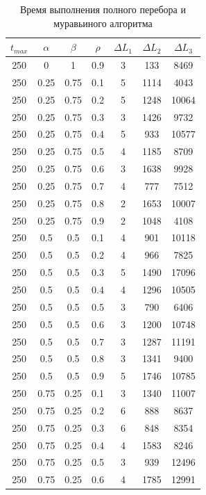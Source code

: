 \documentclass[12pt]{report}
\begin{document}
	\begin{table}[H]
		\begin{center}
			\caption[]{\label{tbl:only7} Время выполнения полного перебора и муравьиного алгоритма}
			\begin{tabular}{|c|c|c|c|c|c|c|}
				\hline
				$t_{max}$ & $\alpha$ & $\beta$ &$\rho$ & $\Delta L_{1}$ & $\Delta L_{2}$ & $\Delta L_{3}$\\
				\hline
				250 & 0 & 1 & 0.9 & 3 & 133 & 8469 \\
				250 & 0.25 & 0.75 & 0.1 & 5 & 1114 & 4043 \\
				250 & 0.25 & 0.75 & 0.2 & 5 & 1248 & 10064 \\
				250 & 0.25 & 0.75 & 0.3 & 3 & 1426 & 9732 \\
				250 & 0.25 & 0.75 & 0.4 & 5 & 933 & 10577 \\
				250 & 0.25 & 0.75 & 0.5 & 4 & 1185 & 8709 \\
				250 & 0.25 & 0.75 & 0.6 & 3 & 1638 & 9928 \\
				250 & 0.25 & 0.75 & 0.7 & 4 & 777 & 7512 \\
				250 & 0.25 & 0.75 & 0.8 & 2 & 1653 & 10007 \\
				250 & 0.25 & 0.75 & 0.9 & 2 & 1048 & 4108 \\
				250 & 0.5 & 0.5 & 0.1 & 4 & 901 & 10118 \\
				250 & 0.5 & 0.5 & 0.2 & 4 & 966 & 7825 \\
				250 & 0.5 & 0.5 & 0.3 & 5 & 1490 & 17096 \\
				250 & 0.5 & 0.5 & 0.4 & 4 & 1296 & 10505 \\
				250 & 0.5 & 0.5 & 0.5 & 3 & 790 & 6406 \\
				250 & 0.5 & 0.5 & 0.6 & 3 & 1200 & 10748 \\
				250 & 0.5 & 0.5 & 0.7 & 3 & 1287 & 11191 \\
				250 & 0.5 & 0.5 & 0.8 & 3 & 1341 & 9400 \\
				250 & 0.5 & 0.5 & 0.9 & 5 & 1746 & 10785 \\
				250 & 0.75 & 0.25 & 0.1 & 3 & 1340 & 11007 \\
				250 & 0.75 & 0.25 & 0.2 & 6 & 888 & 8637 \\
				250 & 0.75 & 0.25 & 0.3 & 6 & 848 & 8354 \\
				250 & 0.75 & 0.25 & 0.4 & 4 & 1583 & 8246 \\
				250 & 0.75 & 0.25 & 0.5 & 3 & 939 & 12496 \\
				250 & 0.75 & 0.25 & 0.6 & 4 & 1785 & 12991 \\

\end{tabular}
\end{center}
\end{table}
\end{document}
